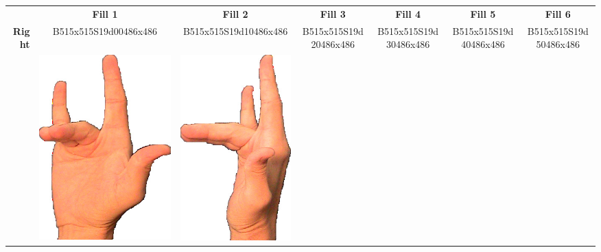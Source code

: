 \documentclass{article}
\begin{document}
\begin{center}
\begin{tabular}{r*{6}{c}}
&\textbf{Fill 1}&\textbf{Fill 2}&\textbf{Fill 3}&\textbf{Fill 4}&\textbf{Fill 5}&\textbf{Fill 6}\\
\multirow{2}{*}{\textbf{Right}}&
B515x515S19d00486x486&
B515x515S19d10486x486&
B515x515S19d20486x486&
B515x515S19d30486x486&
B515x515S19d40486x486&
B515x515S19d50486x486\\
&
\includegraphics[scale=0.1]{images/06-10-1.jpg}&
\includegraphics[scale=0.1]{images/06-10-2.jpg}&

\end{tabular}
\end{center}
\end{document}
